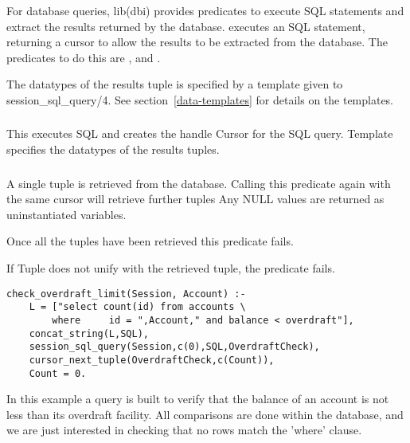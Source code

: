 For database queries, lib(dbi) provides predicates to execute SQL
statements and extract the results returned by the database.
executes an SQL statement, returning a cursor to allow the results to be
extracted from the database. The predicates to do this are
,
 and
.

The datatypes of the results tuple is specified by a template given to
session_sql_query/4. See section~\ref{data-templates} for details on the
templates.  

\subsubsection
{}
\label{session-sql-query/5}

This executes SQL and creates the handle Cursor for the SQL query. Template
specifies the datatypes of the results tuples.

\subsubsection
{}
\label{cursor-next-tuple/2}

A single tuple is retrieved from the database.  Calling this
predicate again with the same cursor will retrieve further tuples
Any NULL values are returned as uninstantiated variables.

Once all the tuples have been retrieved this predicate fails.

If Tuple does not unify with the retrieved tuple, the predicate fails.

\begin{verbatim}
check_overdraft_limit(Session, Account) :-
    L = ["select count(id) from accounts \
        where     id = ",Account," and balance < overdraft"],
    concat_string(L,SQL),
    session_sql_query(Session,c(0),SQL,OverdraftCheck),
    cursor_next_tuple(OverdraftCheck,c(Count)),
    Count = 0.
\end{verbatim}
In this example a query is built to verify that the balance of an
account is not less than its overdraft facility. All comparisons
are done within the database, and we are just interested in checking
that no rows match the 'where' clause.

